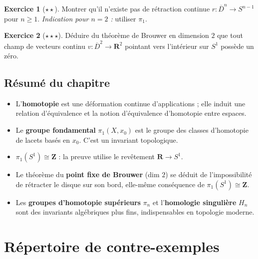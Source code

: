 \documentclass[12pt,a4paper,openany]{book}
\theoremstyle{definition}
\theoremstyle{cours}
\theoremstyle{coursnormal}
\newtheorem{exercice}{Exercice}[chapter]
\begin{document}
\begin{exercice}[$\star\star$]
\label{exo:retraction-Dn}
Montrer qu'il n'existe pas de rétraction continue
$r\colon\overline{D}^n\to S^{n-1}$ pour $n\ge 1$. \textit{Indication
pour $n=2$ :} utiliser $\pi_1$.
\end{exercice}

\begin{exercice}[$\star\star\star$]
\label{exo:brouwer-applications}
Déduire du théorème de Brouwer en dimension $2$ que tout champ de
vecteurs continu $v\colon\overline{D}^2\to\mathbf{R}^2$ pointant
vers l'intérieur sur $S^1$ possède un zéro.
\end{exercice}

\section*{Résumé du chapitre~\thechapter}

\begin{itemize}
  \item L'\textbf{homotopie} est une déformation continue d'applications ;
    elle induit une relation d'équivalence et la notion d'équivalence
    d'homotopie entre espaces.
  \item Le \textbf{groupe fondamental} $\pi_1(X,x_0)$ est le groupe des
    classes d'homotopie de lacets basés en $x_0$. C'est un invariant
    topologique.
  \item $\pi_1(S^1)\cong\mathbf{Z}$ : la preuve utilise le revêtement
    $\mathbf{R}\to S^1$.
  \item Le théorème du \textbf{point fixe de Brouwer} (dim $2$) se
    déduit de l'impossibilité de rétracter le disque sur son bord,
    elle-même conséquence de $\pi_1(S^1)\cong\mathbf{Z}$.
  \item Les \textbf{groupes d'homotopie supérieurs} $\pi_n$ et
    l'\textbf{homologie singulière} $H_n$ sont des invariants
    algébriques plus fins, indispensables en topologie moderne.
\end{itemize}

\appendix
\chapter{Répertoire de contre-exemples}
\label{app:contre-exemples}
\end{document}
